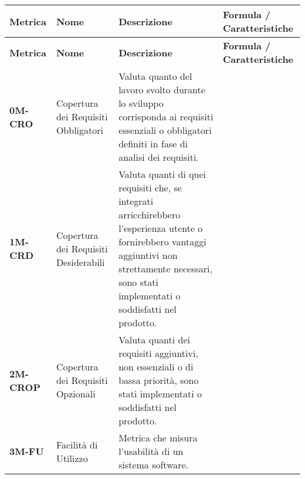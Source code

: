 \begin{longtable}{|>{\centering\arraybackslash}p{}|>{\centering\arraybackslash}p{}|>{\centering\arraybackslash}p{}|>{\centering\arraybackslash}p{}|}
	\hline
	\textbf{Metrica} & \textbf{Nome}                        & \textbf{Descrizione}                                                                                                                                                                                    & \textbf{Formula / Caratteristiche}                                                                   \\
	\hline
	\endfirsthead
	\hline
	\textbf{Metrica} & \textbf{Nome}                        & \textbf{Descrizione}                                                                                                                                                                                    & \textbf{Formula / Caratteristiche}                                                                   \\
	\endhead
	\textbf{0M-CRO}  & Copertura dei Requisiti Obbligatori  & Valuta quanto del lavoro svolto durante lo sviluppo corrisponda ai requisiti essenziali o obbligatori definiti in fase di analisi dei requisiti.                                                        &                                                                                                      \\
	\hline
	\textbf{1M-CRD}  & Copertura dei Requisiti Desiderabili & Valuta quanti di quei requisiti che, se integrati arricchirebbero l'esperienza utente o fornirebbero vantaggi aggiuntivi non strettamente necessari, sono stati implementati o soddisfatti nel prodotto. &                                                                                                      \\
	\hline
	\textbf{2M-CROP} & Copertura dei Requisiti Opzionali    & Valuta quanti dei requisiti aggiuntivi, non essenziali o di bassa priorità, sono stati implementati o soddisfatti nel prodotto.                                                                         &                                                                                                      \\
	\hline
	\textbf{3M-FU}   & Facilità di Utilizzo                 & Metrica che misura l'usabilità di un sistema software.                                                                                                                                                  &                                                                                                      \\

\end{longtable}
